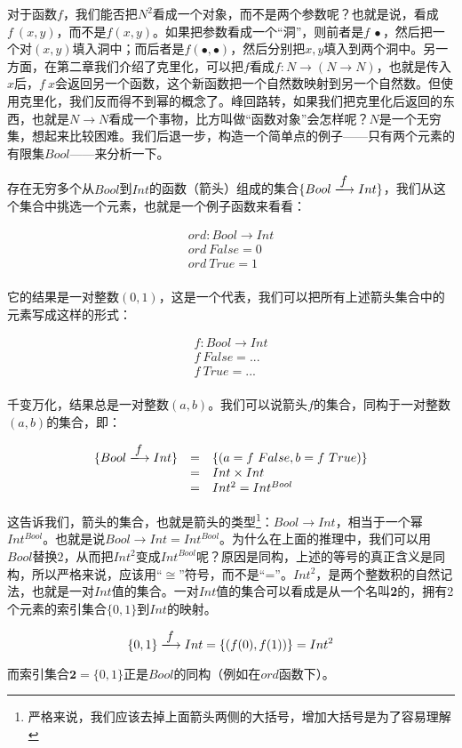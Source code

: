 \documentclass{article}
\begin{document}
对于函数$f$，我们能否把$N^2$看成一个对象，而不是两个参数呢？也就是说，看成$f\ (x, y)$，而不是$f(x, y)$。如果把参数看成一个“洞”，则前者是$f\ \bullet$，然后把一个对$(x, y)$填入洞中；而后者是$f(\bullet, \bullet)$，然后分别把$x, y$填入到两个洞中。另一方面，在第二章我们介绍了克里化，可以把$f$看成$f: N \to (N \to N)$，也就是传入$x$后，$f\ x$会返回另一个函数，这个新函数把一个自然数映射到另一个自然数。但使用克里化，我们反而得不到幂的概念了。峰回路转，如果我们把克里化后返回的东西，也就是$N \to N$看成一个事物，比方叫做“函数对象”会怎样呢？$N$是一个无穷集，想起来比较困难。我们后退一步，构造一个简单点的例子——只有两个元素的有限集$Bool$——来分析一下。

\begin{example}
存在无穷多个从$Bool$到$Int$的函数（箭头）组成的集合$\{Bool \arrowto{f} Int\}$，我们从这个集合中挑选一个元素，也就是一个例子函数来看看：

\[
\begin{array}{l}
ord : Bool \to Int \\
ord\ False = 0 \\
ord\ True = 1 \\
\end{array}
\]

它的结果是一对整数$(0, 1)$，这是一个代表，我们可以把所有上述箭头集合中的元素写成这样的形式：

\[
\begin{array}{l}
f : Bool \to Int \\
f\ False = ... \\
f\ True = ... \\
\end{array}
\]

千变万化，结果总是一对整数$(a, b)$。我们可以说箭头$f$的集合，同构于一对整数$(a, b)$的集合，即：

\[
\begin{array}{rcl}
\{Bool \arrowto{f} Int\} & = & \{(a = f\ False, b = f\ True)\} \\
  & = & Int \times Int \\
  & = & Int^2 = Int^{Bool}
\end{array}
\]

这告诉我们，箭头的集合，也就是箭头的类型\footnote{严格来说，我们应该去掉上面箭头两侧的大括号，增加大括号是为了容易理解}：$Bool \to Int$，相当于一个幂$Int^{Bool}$。也就是说$Bool \to Int = Int^{Bool}$。为什么在上面的推理中，我们可以用$Bool$替换$2$，从而把$Int^2$变成$Int^{Bool}$呢？原因是同构，上述的等号的真正含义是同构，所以严格来说，应该用“$\cong$”符号，而不是“=”。$Int^2$，是两个整数积的自然记法，也就是一对$Int$值的集合。一对$Int$值的集合可以看成是从一个名叫\textbf{2}的，拥有2个元素的索引集合$\{0, 1\}$到$Int$的映射。

\[
\{0, 1\} \arrowto{f} Int = \{(f(0), f(1))\} = Int^2
\]

而索引集合$\mathbf{2} = \{0, 1\}$正是$Bool$的同构（例如在$ord$函数下）。
\end{example}
\end{document}
